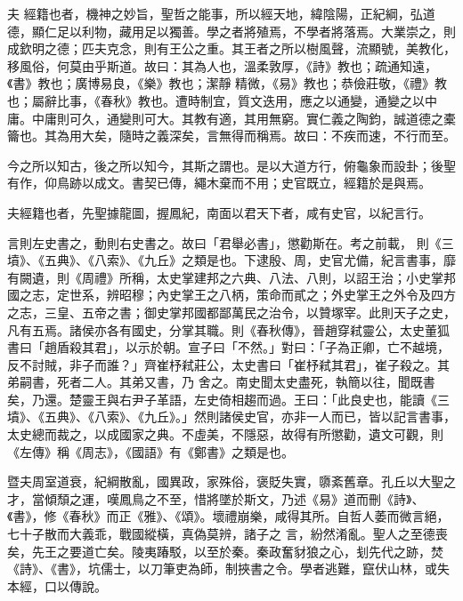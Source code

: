 
\begin{pinyinscope}

 夫
 經籍也者，機神之妙旨，聖哲之能事，所以經天地，緯陰陽，正紀綱，弘道德，顯仁足以利物，藏用足以獨善。學之者將殖焉，不學者將落焉。大業崇之，則成欽明之德；匹夫克念，則有王公之重。其王者之所以樹風聲，流顯號，美教化，移風俗，何莫由乎斯道。故曰：其為人也，溫柔敦厚，《詩》教也；疏通知遠，《書》教也；廣博易良，《樂》教也；潔靜
 精微，《易》教也；恭儉莊敬，《禮》教也；屬辭比事，《春秋》教也。遭時制宜，質文迭用，應之以通變，通變之以中庸。中庸則可久，通變則可大。其教有適，其用無窮。實仁義之陶鈞，誠道德之橐籥也。其為用大矣，隨時之義深矣，言無得而稱焉。故曰：不疾而速，不行而至。



 今之所以知古，後之所以知今，其斯之謂也。是以大道方行，俯龜象而設卦；後聖有作，仰鳥跡以成文。書契已傳，繩木棄而不用；史官既立，經籍於是與焉。



 夫經籍也者，先聖據龍圖，握鳳紀，南面以君天下者，咸有史官，以紀言行。



 言則左史書之，動則右史書之。故曰「君舉必書」，懲勸斯在。考之前載，
 則《三墳》、《五典》、《八索》、《九丘》之類是也。下逮殷、周，史官尤備，紀言書事，靡有闕遺，則《周禮》所稱，太史掌建邦之六典、八法、八則，以詔王治；小史掌邦國之志，定世系，辨昭穆；內史掌王之八柄，策命而貳之；外史掌王之外令及四方之志，三皇、五帝之書；御史掌邦國都鄙萬民之治令，以贊塚宰。此則天子之史，凡有五焉。諸侯亦各有國史，分掌其職。則《春秋傳》，晉趙穿弒靈公，太史董狐書曰「趙盾殺其君」，以示於朝。宣子曰「不然。」對曰：「子為正卿，亡不越境，反不討賊，非子而誰？」齊崔杼弒莊公，太史書曰「崔杼弒其君」，崔子殺之。其弟嗣書，死者二人。其弟又書，乃
 舍之。南史聞太史盡死，執簡以往，聞既書矣，乃還。楚靈王與右尹子革語，左史倚相趨而過。王曰：「此良史也，能讀《三墳》、《五典》、《八索》、《九丘》。」然則諸侯史官，亦非一人而已，皆以記言書事，太史總而裁之，以成國家之典。不虛美，不隱惡，故得有所懲勸，遺文可觀，則《左傳》稱《周志》，《國語》有《鄭書》之類是也。



 暨夫周室道衰，紀綱散亂，國異政，家殊俗，褒貶失實，隳紊舊章。孔丘以大聖之才，當傾頹之運，嘆鳳鳥之不至，惜將墜於斯文，乃述《易》道而刪《詩》、《書》，修《春秋》而正《雅》、《頌》。壞禮崩樂，咸得其所。自哲人萎而微言絕，七十子散而大義乖，戰國縱橫，真偽莫辨，諸子之
 言，紛然淆亂。聖人之至德喪矣，先王之要道亡矣。陵夷踳駁，以至於秦。秦政奮豺狼之心，刬先代之跡，焚《詩》、《書》，坑儒士，以刀筆吏為師，制挾書之令。學者逃難，竄伏山林，或失本經，口以傳說。




\end{pinyinscope}
